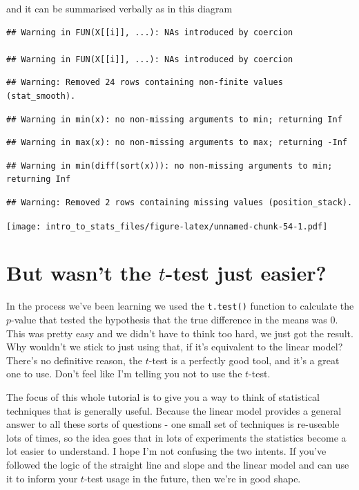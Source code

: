 \documentclass[
]{book}
\begin{document}
and it can be summarised verbally as in this diagram

\begin{verbatim}
## Warning in FUN(X[[i]], ...): NAs introduced by coercion

## Warning in FUN(X[[i]], ...): NAs introduced by coercion
\end{verbatim}

\begin{verbatim}
## Warning: Removed 24 rows containing non-finite values (stat_smooth).
\end{verbatim}

\begin{verbatim}
## Warning in min(x): no non-missing arguments to min; returning Inf
\end{verbatim}

\begin{verbatim}
## Warning in max(x): no non-missing arguments to max; returning -Inf
\end{verbatim}

\begin{verbatim}
## Warning in min(diff(sort(x))): no non-missing arguments to min; returning Inf
\end{verbatim}

\begin{verbatim}
## Warning: Removed 2 rows containing missing values (position_stack).
\end{verbatim}

\texttt{[image: intro\_to\_stats\_files/figure-latex/unnamed-chunk-54-1.pdf]}

\hypertarget{but-wasnt-the-t-test-just-easier}{%
\section{\texorpdfstring{But wasn't the \(t\)-test just easier?}{But wasn't the t-test just easier?}}\label{but-wasnt-the-t-test-just-easier}}

In the process we've been learning we used the \texttt{t.test()} function to calculate the \(p\)-value that tested the hypothesis that the true difference in the means was 0. This was pretty easy and we didn't have to think too hard, we just got the result. Why wouldn't we stick to just using that, if it's equivalent to the linear model? There's no definitive reason, the \(t\)-test is a perfectly good tool, and it's a great one to use. Don't feel like I'm telling you not to use the \(t\)-test.

The focus of this whole tutorial is to give you a way to think of statistical techniques that is generally useful. Because the linear model provides a general answer to all these sorts of questions - one small set of techniques is re-useable lots of times, so the idea goes that in lots of experiments the statistics become a lot easier to understand. I hope I'm not confusing the two intents. If you've followed the logic of the straight line and slope and the linear model and can use it to inform your \(t\)-test usage in the future, then we're in good shape.
\end{document}
